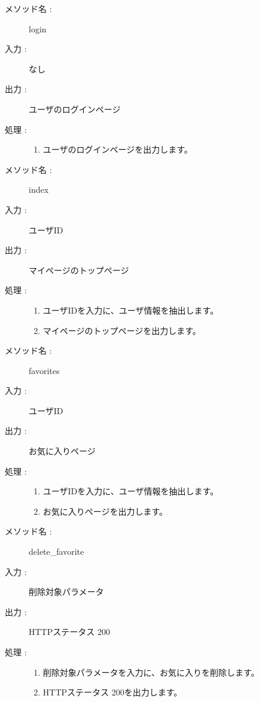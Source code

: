 \documentclass[a4j,titlepage]{jarticle}
\begin{document}
\begin{description}
\item [メソッド名 :] login
\item [入力 :] なし
\item [出力 :] ユーザのログインページ
\item [処理 :]\mbox{}
  \begin{enumerate}
 \item ユーザのログインページを出力します。
 \end{enumerate}
\end{description}

\begin{description}
\item [メソッド名 :] index
\item [入力 :] ユーザID
\item [出力 :] マイページのトップページ
\item [処理 :]\mbox{}
  \begin{enumerate}
  \item ユーザIDを入力に、ユーザ情報を抽出します。
  \item マイページのトップページを出力します。
 \end{enumerate}
\end{description}

\begin{description}
\item [メソッド名 :] favorites
\item [入力 :] ユーザID
\item [出力 :] お気に入りページ
\item [処理 :]\mbox{}
  \begin{enumerate}
  \item ユーザIDを入力に、ユーザ情報を抽出します。
  \item お気に入りページを出力します。
 \end{enumerate}
\end{description}

\begin{description}
\item [メソッド名 :] delete\_favorite
\item [入力 :] 削除対象パラメータ
\item [出力 :] HTTPステータス 200
\item [処理 :]\mbox{}
  \begin{enumerate}
  \item 削除対象パラメータを入力に、お気に入りを削除します。
  \item HTTPステータス 200を出力します。
  \end{enumerate}
\end{description}
\end{document}
